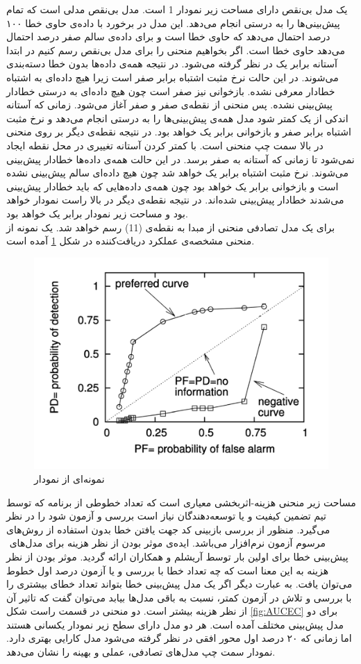 یک مدل بی‌نقص دارای مساحت زیر نمودار 1 است.  مدل بی‌نقص مدلی است که تمام پیش‌بینی‌ها را به درستی انجام می‌دهد. این مدل  در برخورد با داده‌ی حاوی خطا ۱۰۰ درصد احتمال می‌دهد که حاوی خطا است  و برای داده‌ی سالم صفر درصد احتمال می‌دهد حاوی خطا است. اگر بخواهیم منحنی را برای مدل بی‌نقص رسم کنیم در ابتدا آستانه  برابر یک  در نظر گرفته می‌شود. در نتیجه همه‌ی داده‌ها بدون خطا دسته‌بندی می‌شوند. در این حالت نرخ مثبت اشتباه برابر صفر است زیرا هیچ داده‌ای به اشتباه خطادار معرفی نشده. بازخوانی نیز صفر است چون هیچ داده‌ای به درستی خطادار پیش‌بینی نشده. پس منحنی از نقطه‌ی صفر و صفر آغاز می‌شود. زمانی که آستانه اندکی از یک کمتر شود مدل همه‌ی پیش‌بینی‌ها را به درستی انجام می‌دهد و نرخ مثبت اشتباه برابر صفر و بازخوانی برابر یک خواهد بود. در نتیجه نقطه‌ی دیگر  بر روی منحنی در بالا سمت چپ منحنی است. با کمتر کردن آستانه تغییری در محل نقطه ایجاد نمی‌شود تا زمانی که آستانه به صفر برسد. در این حالت همه‌ی داده‌ها خطادار پیش‌بینی می‌شوند. نرخ مثبت اشتباه برابر یک خواهد شد چون هیچ داده‌ای سالم پیش‌بینی نشده است و بازخوانی برابر یک خواهد بود چون همه‌ی داده‌هایی که باید خطادار پیش‌بینی می‌شدند خطا‌دار پیش‌بینی شده‌اند. در نتیجه نقطه‌ی دیگر در بالا راست نمودار خواهد بود و مساحت زیر نمودار برابر یک خواهد بود. \\

برای یک مدل تصادفی  منحنی از مبدا به نقطه‌ی (1\lr{,}1) رسم خواهد شد. یک نمونه از منحنی مشخصه‌ی عملکرد دریافت‌کننده در شکل \ref{fig:ROC} آمده است. \\

\begin{figure}
	\centering
	\includegraphics[width=.60\textwidth]{img/ROC.PNG}
	\caption{ نمونه‌ای از نمودار  \cite{menzies2007data}}
	\label{fig:ROC}
\end{figure}

 مساحت زیر منحنی هزینه-اثربخشی معیاری است که تعداد خطوطی از برنامه که  توسط تیم تضمین کیفیت و یا توسعه‌دهندگان نیاز است بررسی و آزمون شود را در نظر می‌گیرد. منظور از بررسی بازبینی کد جهت یافتن خطا بدون استفاده از روش‌های مرسوم آزمون نرم‌افزار می‌باشد. ایده‌ی  موثر بودن از نظر هزینه
برای مدل‌های ‌‌ پیش‌بینی خطا برای اولین بار توسط آریشلم و همکاران \cite{arisholm2007data} ارائه گردید. موثر بودن از نظر هزینه به این معنا است که چه تعداد خطا با بررسی و یا آزمون    درصد اول خطوط می‌توان یافت. به عبارت دیگر اگر یک مدل پیش‌بینی خطا بتواند تعداد خطای بیشتری را با بررسی و تلاش در آزمون کمتر، نسبت به باقی مدل‌ها بیابد می‌توان گفت که تاثیر آن از نظر هزینه بیشتر است. دو منحنی در  قسمت راست شکل \ref{fig:AUCEC} برای دو مدل پیش‌بینی مختلف آمده است. هر دو مدل دارای سطح زیر نمودار یکسانی هستند اما زمانی که ۲۰ درصد اول محور افقی در نظر گرفته می‌شود مدل 
  کارایی بهتری دارد. نمودار سمت چپ مدل‌های تصادفی، عملی و بهینه را نشان می‌دهد.

